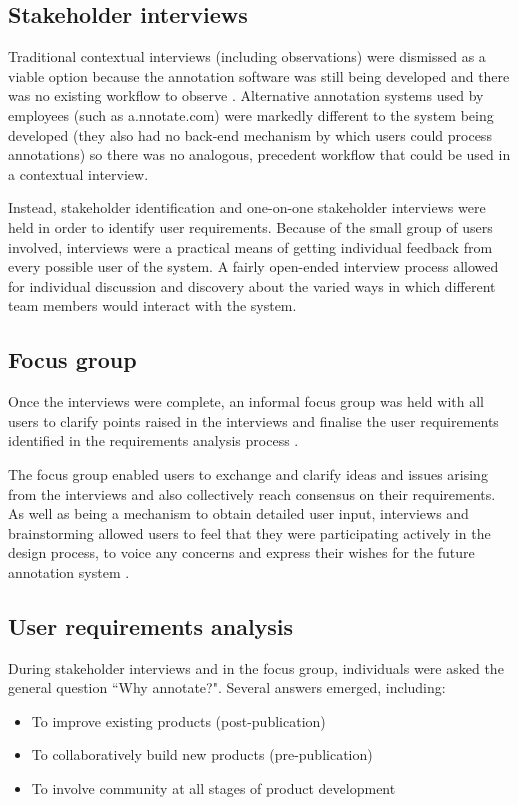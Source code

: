 \subsection{Stakeholder interviews}
Traditional contextual interviews (including observations) were dismissed as a viable option because the annotation software was still being developed and there was no existing workflow to observe \citep[p. 38]{BeyerHoltzblatt}. Alternative annotation systems used by employees (such as a.nnotate.com) were markedly different to the system being developed (they also had no back-end mechanism by which users could process annotations) so there was no analogous, precedent workflow that could be used in a contextual interview. 

Instead, stakeholder identification and one-on-one stakeholder interviews were held in order to identify user requirements. Because of the small group of users involved, interviews were a practical means of getting individual feedback from every possible user of the system. A fairly open-ended interview process allowed for individual discussion and discovery about the varied ways in which different team members would interact with the system. 

\subsection{Focus group}
Once the interviews were complete, an informal focus group was held with all users to clarify points raised in the interviews and finalise the user requirements identified in the requirements analysis process \citep[p. 365]{RogersPreece}. 

The focus group enabled users to exchange and clarify ideas and issues arising from the interviews and also collectively reach consensus on their requirements. As well as being a mechanism to obtain detailed user input, interviews and brainstorming allowed users to feel that they were participating actively in the design process, to voice any concerns and express their wishes for the future annotation system \citep[p. 365]{RogersPreece}. 

\subsection{User requirements analysis}
During stakeholder interviews and in the focus group, individuals were asked the general question ``Why annotate?". Several answers emerged, including: 
\begin{itemize}
 \item To improve existing products (post-publication)
 \item To collaboratively build new products (pre-publication)
 \item To involve community at all stages of product development
\end{itemize}

